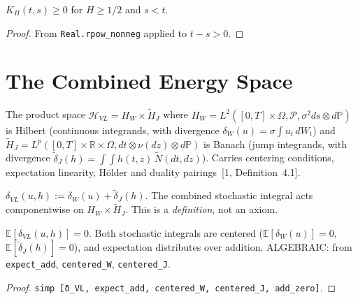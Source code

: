 \begin{theorem}\label{thm:fractionalKernel_nonneg}
\leanok
{}
$K_H(t,s) \geq 0$ for $H \geq 1/2$ and $s < t$.
\end{theorem}
\begin{proof}\leanok From \texttt{Real.rpow\_nonneg} applied to $t - s > 0$.\end{proof}

\section{The Combined Energy Space}

\begin{defn}\label{def:CombinedEnergySpace}
\leanok
The product space $\mathcal{H}_{VL} = H_W \times \tilde{H}_J$ where $H_W = L^2([0,T] \times \Omega, \mathcal{P}, \sigma^2 ds \otimes d\mathbb{P})$ is Hilbert (continuous integrands, with divergence $\delta_W(u) = \sigma \int u_t\,dW_t$) and $\tilde{H}_J = L^p([0,T] \times \mathbb{R} \times \Omega, dt \otimes \nu(dz) \otimes d\mathbb{P})$ is Banach (jump integrands, with divergence $\tilde{\delta}_J(h) = \int\!\!\int h(t,z)\,\tilde{N}(dt,dz)$). Carries centering conditions, expectation linearity, H\"older and duality pairings~[1, Definition~4.1].
\end{defn}

\begin{defn}\label{def:delta_VL}
\leanok
{}
$\delta_{VL}(u,h) := \delta_W(u) + \tilde{\delta}_J(h)$. The combined stochastic integral acts componentwise on $H_W \times \tilde{H}_J$. This is a \emph{definition}, not an axiom.
\end{defn}

\begin{theorem}\label{thm:delta_VL_centered}
\leanok
{}
$\mathbb{E}[\delta_{VL}(u,h)] = 0$. Both stochastic integrals are centered ($\mathbb{E}[\delta_W(u)] = 0$, $\mathbb{E}[\tilde{\delta}_J(h)] = 0$), and expectation distributes over addition. ALGEBRAIC: from \texttt{expect\_add}, \texttt{centered\_W}, \texttt{centered\_J}.
\end{theorem}
\begin{proof}\leanok \texttt{simp [δ\_VL, expect\_add, centered\_W, centered\_J, add\_zero]}.\end{proof}

